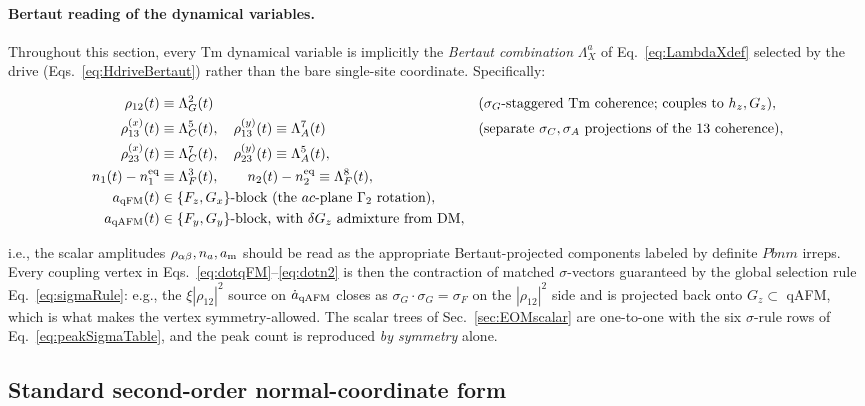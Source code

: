\documentclass[reprint,amsmath,amssymb,aps,prb,longbibliography]{revtex4-2}
\begin{document}
\paragraph{Bertaut reading of the dynamical variables.} Throughout
this section, every Tm dynamical variable is implicitly the
\emph{Bertaut combination} $\Lambda^a_X$ of Eq.~\eqref{eq:LambdaXdef}
selected by the drive (Eqs.~\eqref{eq:HdriveBertaut}) rather than the
bare single-site coordinate. Specifically:
\begin{widetext}
\begin{equation}
\begin{aligned}
\rho_{12}(t) &\equiv \Lambda^2_G(t)
  &&\text{($\sigma_G$-staggered Tm coherence; couples to $h_z, G_z$)},\\
\rho_{13}^{(x)}(t) &\equiv \Lambda^5_C(t),\quad
\rho_{13}^{(y)}(t) \equiv \Lambda^7_A(t)
  &&\text{(separate $\sigma_C, \sigma_A$ projections of the }13\text{ coherence)},\\
\rho_{23}^{(x)}(t) &\equiv \Lambda^7_C(t),\quad
\rho_{23}^{(y)}(t) \equiv \Lambda^5_A(t),\\
n_1(t)-n_1^{\rm eq} &\equiv \Lambda^3_F(t),\qquad n_2(t)-n_2^{\rm eq} \equiv \Lambda^8_F(t),\\
a_{\rm qFM}(t) &\in \{F_z, G_x\}\text{-block (the $ac$-plane }\Gamma_2\text{ rotation)},\\
a_{\rm qAFM}(t) &\in \{F_y, G_y\}\text{-block, with } \delta G_z\text{ admixture from DM},
\end{aligned}
\label{eq:dynBertaut}
\end{equation}
\end{widetext}
i.e., the scalar amplitudes $\rho_{\alpha\beta}, n_a, a_{\rm m}$
should be read as the appropriate Bertaut-projected components
labeled by definite $Pbnm$ irreps. Every coupling vertex in
Eqs.~\eqref{eq:dotqFM}--\eqref{eq:dotn2} is then the contraction of
matched $\sigma$-vectors guaranteed by the global selection rule
Eq.~\eqref{eq:sigmaRule}: e.g., the $\xi|\rho_{12}|^2$ source on
$\dot a_{\rm qAFM}$ closes as $\sigma_G\!\cdot\!\sigma_G=\sigma_F$ on
the $|\rho_{12}|^2$ side and is projected back onto $G_z\subset$ qAFM,
which is what makes the vertex symmetry-allowed. The scalar
trees of Sec.~\ref{sec:EOMscalar} are one-to-one with the six
$\sigma$-rule rows of
Eq.~\eqref{eq:peakSigmaTable}, and the
peak count is reproduced \emph{by symmetry} alone.

\subsection{Standard second-order normal-coordinate form}
\end{document}
